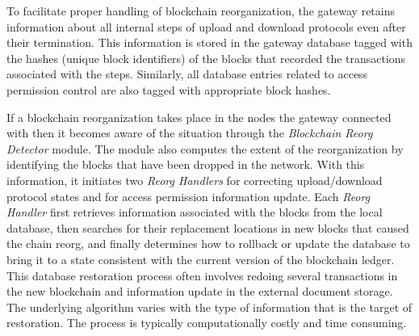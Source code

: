 To facilitate proper handling of blockchain reorganization, the gateway retains information about all internal steps of upload and download protocols even after their termination. This information is stored in the gateway database tagged with the hashes (unique block identifiers) of the blocks that recorded the transactions associated with the steps. Similarly, all database entries related to access permission control are also tagged with appropriate block hashes.

If a blockchain reorganization takes place in the nodes the gateway connected with then it becomes aware of the situation through the {\it Blockchain Reorg Detector} module. The module also computes the extent of the reorganization by identifying the blocks that have been dropped in the network. With this information, it initiates two {\it Reorg Handlers} for correcting  upload/download protocol states and for access permission information update. Each {\it Reorg Handler} first retrieves information associated with the blocks from the local database, then searches for their replacement locations in new blocks that caused the chain reorg, and finally determines how to rollback or update the database to bring it to a state consistent with the current version of the blockchain ledger. This database restoration process often involves redoing several transactions in the new blockchain and information update in the external document storage. The underlying algorithm varies with the type of information that is the target of restoration. The process is typically computationally costly and time consuming.                  
       

